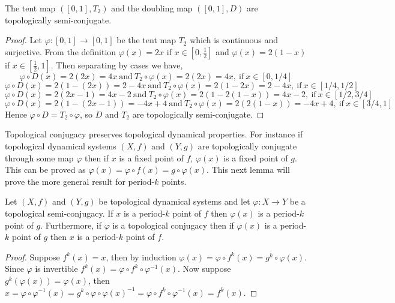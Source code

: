 \begin{prop} \label{prop:tent-doubling-semi-conjugate}
    The tent map $([0, 1], T_2)$ and the doubling map $([0, 1], D)$ are topologically semi-conjugate.
    \begin{proof}
        Let $\varphi: [0, 1] \to [0, 1]$ be the tent map $T_2$ which is continuous and surjective. From the definition $\varphi(x) = 2x$ if $x \in \left[0, \frac{1}{2}\right]$ and $\varphi(x) = 2(1-x)$ if $x \in \left[\frac{1}{2}, 1\right]$. Then separating by cases we have, \[\varphi \circ D(x) = 2(2x) = 4x \ \text{and} \ T_2 \circ \varphi(x) = 2(2x) = 4x, \ \text{if} \ x \in \left[0, 1/4\right]\] \[\varphi \circ D(x) = 2(1 - (2x)) = 2 - 4x \ \text{and} \ T_2 \circ \varphi(x) = 2(1-2x) = 2 - 4x, \ \text{if} \ x \in \left[1/4, 1/2\right]\] \[\varphi \circ D(x) = 2(2x-1) = 4x - 2 \ \text{and} \ T_2 \circ \varphi(x) = 2(1-2(1-x)) = 4x - 2, \ \text{if} \ x \in \left[1/2, 3/4\right]\] \[\varphi \circ D(x) = 2(1-(2x - 1)) = - 4x + 4 \ \text{and} \ T_2 \circ \varphi(x) = 2(2(1-x)) = -4x + 4, \ \text{if} \ x \in \left[3/4, 1\right]\] Hence $\varphi \circ D = T_2 \circ \varphi$, so $D$ and $T_2$ are topologically semi-conjugate.
    \end{proof}
\end{prop}

Topological conjugacy preserves topological dynamical properties. For instance if topological dynamical systems $(X, f)$ and $(Y, g)$ are topologically conjugate through some map $\varphi$ then if $x$ is a fixed point of $f$, $\varphi(x)$ is a fixed point of $g$. This can be proved as $\varphi(x) = \varphi \circ f(x) = g \circ \varphi(x)$. This next lemma will prove the more general result for period-$k$ points.

\begin{prop} \label{prop:conjugacy-preserves-periodic-points}
    Let $(X, f)$ and $(Y, g)$ be topological dynamical systems and let $\varphi: X \to Y$ be a topological semi-conjugacy. If $x$ is a period-$k$ point of $f$ then $\varphi(x)$ is a period-$k$ point of $g$. Furthermore, if $\varphi$ is a topological conjugacy then if $\varphi(x)$ is a period-$k$ point of $g$ then $x$ is a period-$k$ point of $f.$
    \begin{proof}
        Suppose $f^k(x) = x$, then by induction $\varphi(x) = \varphi \circ f^k(x) = g^k \circ \varphi (x)$. Since $\varphi$ is invertible $f^k(x) = \varphi \circ f^k \circ \varphi^{-1}(x)$. Now suppose $g^k(\varphi(x)) = \varphi(x)$, then $x = \varphi \circ \varphi^{-1}(x) = g^k \circ \varphi \circ \varphi(x)^{-1} = \varphi \circ f^k \circ \varphi^{-1}(x) = f^k(x)$.
    \end{proof}
\end{prop}

